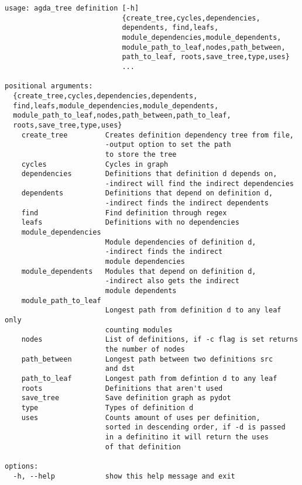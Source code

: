 \noindent
\begin{minipage}{\textwidth}
\begin{lstlisting}[caption={Agda Tree Definition Help Message},label={code:definition help}]
usage: agda_tree definition [-h]
                            {create_tree,cycles,dependencies,
                            dependents, find,leafs,
                            module_dependencies,module_dependents,
                            module_path_to_leaf,nodes,path_between,
                            path_to_leaf, roots,save_tree,type,uses}
                            ...

positional arguments:
  {create_tree,cycles,dependencies,dependents,
  find,leafs,module_dependencies,module_dependents,
  module_path_to_leaf,nodes,path_between,path_to_leaf,
  roots,save_tree,type,uses}
    create_tree         Creates definition dependency tree from file, 
                        -output option to set the path 
                        to store the tree
    cycles              Cycles in graph
    dependencies        Definitions that definition d depends on,
                        -indirect will find the indirect dependencies
    dependents          Definitions that depend on definition d,
                        -indirect finds the indirect dependents
    find                Find definition through regex
    leafs               Definitions with no dependencies
    module_dependencies
                        Module dependencies of definition d, 
                        -indirect finds the indirect 
                        module dependencies
    module_dependents   Modules that depend on definition d, 
                        -indirect also gets the indirect 
                        module dependents
    module_path_to_leaf
                        Longest path from definition d to any leaf only
                        counting modules
    nodes               List of definitions, if -c flag is set returns 
                        the number of nodes
    path_between        Longest path between two definitions src 
                        and dst
    path_to_leaf        Longest path from defintion d to any leaf
    roots               Definitions that aren't used
    save_tree           Save definition graph as pydot
    type                Types of definition d
    uses                Counts amount of uses per definition, 
                        sorted in descending order, if -d is passed 
                        in a definitino it will return the uses 
                        of that definition

options:
  -h, --help            show this help message and exit
\end{lstlisting}
\end{minipage}

